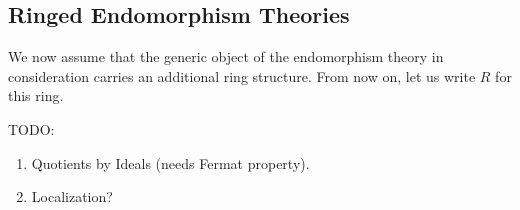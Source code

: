 {\subsection{Ringed Endomorphism Theories}

We now assume that the generic object of the endomorphism theory in consideration carries an additional ring structure.
From now on, let us write \(R\) for this ring.

TODO:
\begin{enumerate}
  \item Quotients by Ideals (needs Fermat property).
  \item Localization?
\end{enumerate}

}
